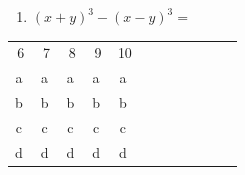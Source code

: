 \documentclass[fleqn]{article}
\begin{document}
\begin{enumerate}
 \begin{enumerate}
 \end{enumerate}
 \item $(x+y)^{3}-(x-y)^{3}=$
 \begin{enumerate}
 \end{enumerate}
 \end{enumerate}
 \begin{center}
\begin{tabular}{cccccccccccc}
6 & 7 & 8 & 9 & 10 \\ 
\textcircled{a} & \textcircled{a} & \textcircled{a} & \textcircled{a} & \textcircled{a}\\ 
\textcircled{b} & \textcircled{b} & \textcircled{b} & \textcircled{b} & \textcircled{b} \\ 
\textcircled{c} & \textcircled{c} & \textcircled{c} & \textcircled{c} & \textcircled{c}\\ 
\textcircled{d} & \textcircled{d} & \textcircled{d} & \textcircled{d} & \textcircled{d} \\ 
\end{tabular} 
\end{center}
\end{document}
